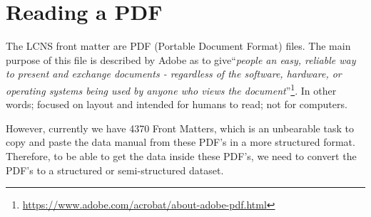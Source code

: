 \documentclass{ou-report}
\begin{document}
\section{Reading a PDF}
The LCNS front matter are PDF (Portable Document Format) files. The main purpose
of this file is described by Adobe as to give``\textit{people an easy, reliable
way to present and exchange documents - regardless of the software, hardware, or
operating systems being used by anyone who views the
document}''\footnote{\url{https://www.adobe.com/acrobat/about-adobe-pdf.html}}. 
In other words; focused on layout and intended for humans to read; not for
computers. 

However, currently we have 4370 Front Matters, which is an unbearable task to 
copy and paste the data manual from these PDF's in a more structured format.
Therefore, to be able to get the data inside these PDF's, we need to convert 
the PDF's to a structured or semi-structured dataset.
\end{document}
